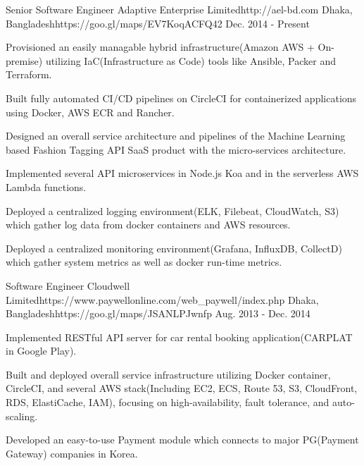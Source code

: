 

\begin{workentries}

\workentry
{Senior Software Engineer} %
{Adaptive Enterprise Limited}{http://ael-bd.com} %
{Dhaka, Bangladesh}{https://goo.gl/maps/EV7KoqACFQ42} %
{Dec. 2014 - Present} %
{
  \begin{workitems} %
    \item {Provisioned an easily managable hybrid infrastructure(Amazon AWS + On-premise) utilizing IaC(Infrastructure as Code) tools like Ansible, Packer and Terraform.}
    \item {Built fully automated CI/CD pipelines on CircleCI for containerized applications using Docker, AWS ECR and Rancher.}
    \item {Designed an overall service architecture and pipelines of the Machine Learning based Fashion Tagging API SaaS product with the micro-services architecture.}
    \item {Implemented several API microservices in Node.js Koa and in the serverless AWS Lambda functions.}
    \item {Deployed a centralized logging environment(ELK, Filebeat, CloudWatch, S3) which gather log data from docker containers and AWS resources.}
    \item {Deployed a centralized monitoring environment(Grafana, InfluxDB, CollectD) which gather system metrics as well as docker run-time metrics.}
  \end{workitems}
}

\workentry
{Software Engineer} %
{Cloudwell Limited}{https://www.paywellonline.com/web_paywell/index.php} %
{Dhaka, Bangladesh}{https://goo.gl/maps/JSANLPJwnfp} %
{Aug. 2013 - Dec. 2014} %
    {
      \begin{workitems} %
        \item {Implemented RESTful API server for car rental booking application(CARPLAT in Google Play).}
        \item {Built and deployed overall service infrastructure utilizing Docker container, CircleCI, and several AWS stack(Including EC2, ECS, Route 53, S3, CloudFront, RDS, ElastiCache, IAM), focusing on high-availability, fault tolerance, and auto-scaling.}
        \item {Developed an easy-to-use Payment module which connects to major PG(Payment Gateway) companies in Korea.}
      \end{workitems}
    }


\end{workentries}
